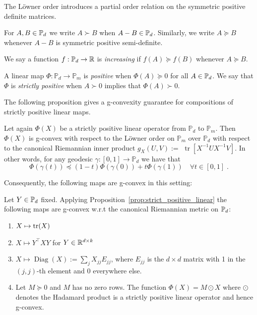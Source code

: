 \documentclass[twoside,11pt]{article}
\begin{document}
The Löwner order introduces a partial order relation on the symmetric positive definite matrices.
%
\begin{definition}\label{def:loewner_order}
    For $A ,B \in \mathbb{P}_d$ we write $A \succ B$ when $A - B \in \mathbb{P}_d$. Similarly, we write $A \succeq B$ whenever $A -B$ is symmetric positive semi-definite.
\end{definition}
%
We say a function $f: \mathbb{P}_d \rightarrow \mathbb{R}$ is \textit{increasing} if $f(A) \succeq f(B)$ whenever $A \succeq B$.
%
\begin{definition}
    A linear map $\Phi:\mathbb{P}_d \to \mathbb{P}_m$ is \textit{positive} when $\Phi(A) \succeq 0$ for all $A \in \mathbb{P}_d$. We say that $\Phi$ is \textit{strictly positive} when $A \succ 0$ implies that $\Phi(A) \succ 0$.
\end{definition}
%
The following proposition gives a g-convexity guarantee for compositions of strictly positive linear maps.
%
\begin{prop}\label{prop:strict_positive_linear}
    Let again $\Phi(X)$ be a strictly positive linear operator from $\mathbb{P}_d$ to $\mathbb{P}_m$. Then $\Phi(X)$ is g-convex with respect to the Löwner order on $\mathbb{P}_m$ over $\mathbb{P}_d$ with respect to the canonical Riemannian inner product $g_X(U, V):=$ $\operatorname{tr}\left[X^{-1} U X^{-1} V\right]$. In other words, for any geodesic $\gamma:[0,1] \rightarrow \mathbb{P}_d$ we have that
$$
\Phi(\gamma(t)) \preceq(1-t) \Phi(\gamma(0))+t \Phi(\gamma(1)) \quad \forall t \in[0,1] \; .
$$
\end{prop}
%
Consequently, the following maps are g-convex in this setting:
%
\begin{example}
    Let $Y \in \mathbb{P}_d$ fixed. Applying Proposition~\ref{prop:strict_positive_linear} the following maps are g-convex w.r.t the canonical Riemannian metric on $\mathbb{P}_d$:
    \begin{enumerate}
    \item $X \mapsto \text{tr}(X)$ 
    \item $X \mapsto Y^\top X Y$ for $Y \in \mathbb{R}^{d \times k}$
    \item $X \mapsto \operatorname{Diag}(X) := \sum_{j}X_{jj}E_{jj}$, where $E_{jj}$ is the $d\times d$ matrix with 1 in the $(j,j)$-th element and 0 everywhere else.
    \item Let $M \succeq 0$ and $M$ has no zero rows.  The function $\Phi(X) = M \odot X$ where $\odot$ denotes the Hadamard product is a strictly positive linear operator and hence g-convex.
    \end{enumerate}
\end{example}
\end{document}
